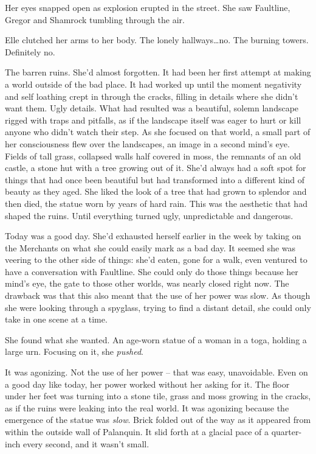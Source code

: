 Her eyes snapped open as explosion erupted in the street.  She saw Faultline, Gregor and Shamrock tumbling through the air.



Elle clutched her arms to her body.  The lonely hallways\ldots no.  The burning towers.  Definitely no.



The barren ruins.  She'd almost forgotten.  It had been her first attempt at making a world outside of the bad place.  It had worked up until the moment negativity and self loathing crept in through the cracks, filling in details where she didn't want them.  Ugly details.  What had resulted was a beautiful, solemn landscape rigged with traps and pitfalls, as if the landscape itself was eager to hurt or kill anyone who didn't watch their step.  As she focused on that world, a small part of her consciousness flew over the landscapes, an image in a second mind's eye.  Fields of tall grass, collapsed walls half covered in moss, the remnants of an old castle, a stone hut with a tree growing out of it.  She'd always had a soft spot for things that had once been beautiful but had transformed into a different kind of beauty as they aged.  She liked the look of a tree that had grown to splendor and then died, the statue worn by years of hard rain.  This was the aesthetic that had shaped the ruins.  Until everything turned ugly, unpredictable and dangerous.



Today was a good day.  She'd exhausted herself earlier in the week by taking on the Merchants on what she could easily mark as a bad day.  It seemed she was veering to the other side of things: she'd eaten, gone for a walk, even ventured to have a conversation with Faultline.  She could only do those things because her mind's eye, the gate to those other worlds, was nearly closed right now.  The drawback was that this also meant that the use of her power was slow.  As though she were looking through a spyglass, trying to find a distant detail, she could only take in one scene at a time.



She found what she wanted.  An age-worn statue of a woman in a toga, holding a large urn.  Focusing on it, she \emph{pushed}.



It was agonizing.  Not the use of her power – that was easy, unavoidable.  Even on a good day like today, her power worked without her asking for it.  The floor under her feet was turning into a stone tile, grass and moss growing in the cracks, as if the ruins were leaking into the real world.  It was agonizing because the emergence of the statue was \emph{slow}.  Brick folded out of the way as it appeared from within the outside wall of Palanquin.  It slid forth at a glacial pace of a quarter-inch every second, and it wasn't small.




